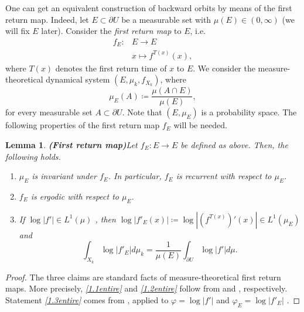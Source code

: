 \documentclass[11pt]{article}
\newtheorem{lemma}[thm]{Lemma}
\theoremstyle{definition}
\theoremstyle{remark}
\theoremstyle{plain}
\begin{document}
One can get an equivalent construction of backward orbits by means of the first return map. Indeed,  let $ E \subset\partial U$ be a measurable set with $ \mu(E)\in (0, \infty) $ (we will fix $ E $ later). Consider the \textit{first return map}  to $ E$, i.e. \begin{align*}
	f_{E}\colon& E\longrightarrow E \\&	x\longmapsto f^{T(x)}(x),
\end{align*}
where  $ T(x) $ denotes the first return time of $ x $ to $ E$. 
We consider the measure-theoretical dynamical system $ (E, \mu_k, f_{X_k}) $, where \[\mu_E(A)\coloneqq \frac{\mu(A\cap E)}{\mu (E)},\] for every measurable set $A\subset  \partial U $. Note that $ (E, \mu_E) $ is a probability space.
The following properties of the first return map $ f_{E} $ will be needed. 
\begin{lemma}{\bf (First return map)}\label{lemma-return-map entire}
	Let $ f_{E}\colon E\to E$ be defined as above. Then, the following holds.\begin{enumerate}[label={\em(1.\arabic*)}]
		\item \label{1.1entire} $ \mu_E $ is invariant under $ f_{E} $. In particular, $ f_{E}$ is recurrent with respect to   $ \mu_E$.
		\item \label{1.2entire}$ f_{E} $ is ergodic with respect to   $ \mu_E $.
		\item\label{1.3entire} If  $ \log \left| f'\right| \in L^1(\mu) $ , then  $ \log \left| f'_{E}(x)\right|\coloneqq  \log \left| (f^{T(x)})'(x)\right| \in L^1(\mu_E) $ and \[ \int_{X_k} \log \left| f'_{E}\right| d\mu_k= \dfrac{1}{\mu (E)} \int_{\partial U} \log \left| f'\right| d\mu.\]
	\end{enumerate}
\end{lemma}
\begin{proof} The three claims are standard facts of measure-theoretical first return maps. More precisely, {\em \ref{1.1entire}} and {\em \ref{1.2entire}} follow from \cite[Prop. 10.2.1]{UrbanskiRoyMunday1} and \cite[Prop. 10.2.7]{UrbanskiRoyMunday1}, respectively. Statement {\em \ref{1.3entire}} comes from \cite[Prop. 10.2.5]{UrbanskiRoyMunday1}, applied to $ \varphi=\log \left| f'\right|  $ and $ \varphi_{E}=\log \left| f'_{E}\right|  $ .
\end{proof}
\end{document}
